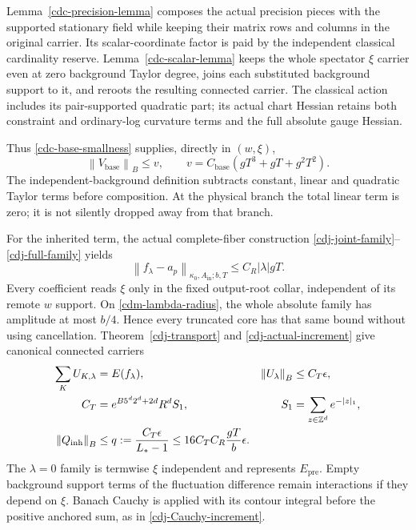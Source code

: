 \documentclass[11pt]{article}
\theoremstyle{remark}
\newcommand{\norm}[1]{\left\|#1\right\|}
\begin{document}
Lemma~\ref{cdc-precision-lemma} composes the actual precision
pieces with the supported stationary field while keeping their
matrix rows and columns in the original carrier. Its
scalar-coordinate factor is paid by the independent classical
cardinality reserve. Lemma~\ref{cdc-scalar-lemma} keeps the
whole spectator $\xi$ carrier even at zero background Taylor
degree, joins each substituted background support to it, and
reroots the resulting connected carrier. The classical action
includes its pair-supported quadratic part; its actual chart
Hessian retains both constraint and ordinary-log curvature
terms and the full absolute gauge Hessian.

Thus \eqref{cdc-base-smallness} supplies, directly in $(w,\xi)$,
\begin{equation}
 \norm{V_{\mathrm{base}}}_B\le v,\qquad
 v=C_{\mathrm{base}}(gT^3+gT+g^2T^2).
 \label{cdm-base-bound}
\end{equation}
The independent-background definition subtracts constant,
linear and quadratic Taylor terms before composition. At the
physical branch the total linear term is zero; it is not
silently dropped away from that branch.

For the inherited term, the actual complete-fiber construction
\eqref{cdj-joint-family}--\eqref{cdj-full-family} yields
\begin{equation}
 \norm{f_\lambda-a_p}_{\kappa_0,A_{\mathrm{in}};b,T}
                 \le C_R|\lambda|gT.
 \label{cdm-actual-family}
\end{equation}
Every coefficient reads $\xi$ only in the fixed output-root
collar, independent of its remote $w$ support. On
\eqref{cdm-lambda-radius}, the whole absolute family has
amplitude at most $b/4$. Hence every truncated core has that
same bound without using cancellation.
Theorem~\ref{cdj-transport} and
\eqref{cdj-actual-increment} give canonical connected carriers
\begin{align}
 \sum_K U_{K,\lambda}&=E(f_\lambda),&
 \norm{U_\lambda}_B&\le C_T\epsilon,\notag\\
 C_T&=e^{B5^d2^d+2d}R^dS_1,&
 S_1&=\sum_{z\in\mathbb Z^d}e^{-|z|_1},\notag\\
 \norm{Q_{\mathrm{inh}}}_B
 &\le q:=\frac{C_T\epsilon}{L_*-1}
 \le16C_TC_R\frac{gT}{b}\epsilon .
 \label{cdm-inherited-bound}
\end{align}
The $\lambda=0$ family is termwise $\xi$ independent and
represents $E_{\mathrm{pre}}$. Empty background support terms
of the fluctuation difference remain interactions if they
depend on $\xi$. Banach Cauchy is applied with its contour
integral before the positive anchored sum, as in
\eqref{cdj-Cauchy-increment}.
\end{document}
